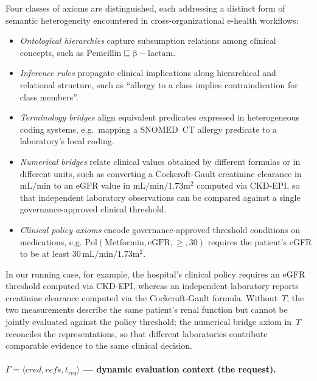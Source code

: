 \documentclass[journal]{IEEEtran}
\begin{document}
Four classes of axioms are distinguished, each addressing a
distinct form of semantic heterogeneity encountered in
cross-organizational e-health workflows:

\begin{itemize}
  \item \textit{Ontological hierarchies} capture subsumption
    relations among clinical concepts, such as
    $\mathrm{Penicillin} \sqsubseteq \mathrm{\beta{-}lactam}$.
  \item \textit{Inference rules} propagate clinical implications
    along hierarchical and relational structure, such as
    ``allergy to a class implies contraindication for class
    members''.
  \item \textit{Terminology bridges} align equivalent predicates
    expressed in heterogeneous coding systems, e.g.\ mapping a
    SNOMED~CT allergy predicate to a laboratory's local coding.
  \item \textit{Numerical bridges} relate clinical values
    obtained by different formulas or in different units, such
    as converting a Cockcroft-Gault creatinine clearance in
    $\mathrm{mL/min}$ to an eGFR value in
    $\mathrm{mL/min/1.73m^2}$ computed via CKD-EPI, so that
    independent laboratory observations can be compared against
    a single governance-approved clinical threshold.
     \item \textit{Clinical policy axioms} encode governance-approved
    threshold conditions on medications, e.g.
    $\mathrm{Pol}(\mathrm{Metformin}, \mathrm{eGFR}, \geq, 30)$
    requires the patient's eGFR to be at least
    $30\,\mathrm{mL/min/1.73m^2}$.
\end{itemize}

In our running case, for example, the hospital's clinical policy
requires an eGFR threshold computed via CKD-EPI, whereas an
independent laboratory reports creatinine clearance computed via
the Cockcroft-Gault formula. Without~$T$, the two measurements
describe the same patient's renal function but cannot be jointly
evaluated against the policy threshold; the numerical bridge
axiom in~$T$ reconciles the representations, so that different
laboratories contribute comparable evidence to the same clinical
decision.

\paragraph{$\Gamma = \langle \mathit{cred}, \mathit{refs},
           \mathit{t_{req}} \rangle$ — dynamic evaluation context
           (the request).}
\end{document}
